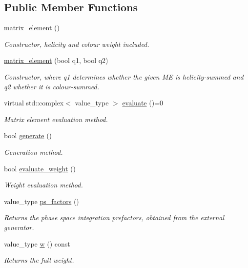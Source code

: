 \subsection*{Public Member Functions}
\begin{DoxyCompactItemize}
\item 
\hypertarget{a00363_a0bbaec502f07f2c2e2e86cc8db1f57a7}{}\hyperlink{a00363_a0bbaec502f07f2c2e2e86cc8db1f57a7}{matrix\+\_\+element} ()\label{a00363_a0bbaec502f07f2c2e2e86cc8db1f57a7}

\begin{DoxyCompactList}\small\item\em Constructor, helicity and colour weight included. \end{DoxyCompactList}\item 
\hyperlink{a00363_a27e710a7f1c07b29a465102b259f7021}{matrix\+\_\+element} (bool q1, bool q2)
\begin{DoxyCompactList}\small\item\em Constructor, where q1 determines whether the given M\+E is helicity-\/summed and q2 whether it is colour-\/summed. \end{DoxyCompactList}\item 
virtual std\+::complex$<$ value\+\_\+type $>$ \hyperlink{a00363_a6d74e7516a6086eb812e0cebc1814641}{evaluate} ()=0
\begin{DoxyCompactList}\small\item\em Matrix element evaluation method. \end{DoxyCompactList}\item 
bool \hyperlink{a00363_a2752785ce5787d0fd58247b5e6a838c0}{generate} ()
\begin{DoxyCompactList}\small\item\em Generation method. \end{DoxyCompactList}\item 
bool \hyperlink{a00363_a0b2e85c881c6721466ad08637f1869a4}{evaluate\+\_\+weight} ()
\begin{DoxyCompactList}\small\item\em Weight evaluation method. \end{DoxyCompactList}\item 
value\+\_\+type \hyperlink{a00363_a023f7b74630c5b84336e4d797af4bf72}{ps\+\_\+factors} ()
\begin{DoxyCompactList}\small\item\em Returns the phase space integration prefactors, obtained from the external generator. \end{DoxyCompactList}\item 
\hypertarget{a00363_a7c38475fbfc849c20eeba3dee6a61db2}{}value\+\_\+type \hyperlink{a00363_a7c38475fbfc849c20eeba3dee6a61db2}{w} () const \label{a00363_a7c38475fbfc849c20eeba3dee6a61db2}

\begin{DoxyCompactList}\small\item\em Returns the full weight. \end{DoxyCompactList}\end{DoxyCompactItemize}
